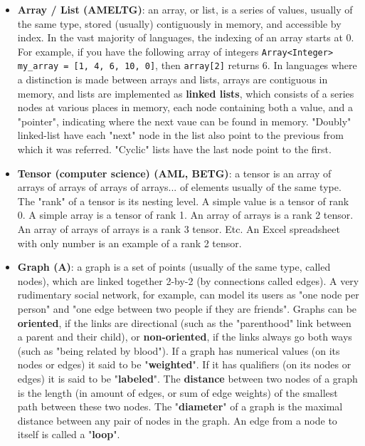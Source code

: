 \documentclass{article}
\begin{document}
\begin{itemize}

	\item \textbf{Array / List (AMELTG)}: an array, or list, is a series of values, usually of the same type, stored (usually) contiguously in memory, and accessible by index. In the vast majority of languages, the indexing of an array starts at 0. For example, if you have the following array of integers \texttt{Array<Integer> my\_array = [1, 4, 6, 10, 0]}, then \texttt{array[2]} returns 6. In languages where a distinction is made between arrays and lists, arrays are contiguous in memory, and lists are implemented as \textbf{linked lists}, which consists of a series nodes at various places in memory, each node containing both a value, and a "pointer", indicating where the next vaue can be found in memory. "Doubly" linked-list have each "next" node in the list also point to the previous from which it was referred. "Cyclic" lists have the last node point to the first.

	\item \textbf{Tensor (computer science) (AML, BETG)}: a tensor is an array of arrays of arrays of arrays of arrays... of elements usually of the same type. The "rank" of a tensor is its nesting level. A simple value is a tensor of rank 0. A simple array is a tensor of rank 1. An array of arrays is a rank 2 tensor. An array of arrays of arrays is a rank 3 tensor. Etc. An Excel spreadsheet with only number is an example of a rank 2 tensor.

	\item \textbf{Graph (A)}: a graph is a set of points (usually of the same type, called nodes), which are linked together 2-by-2 (by connections called edges). A very rudimentary social network, for example, can model its users as "one node per person" and "one edge between two people if they are friends". Graphs can be \textbf{oriented}, if the links are directional (such as the "parenthood" link between a parent and their child), or \textbf{non-oriented}, if the links always go both ways (such as "being related by blood"). If a graph has numerical values (on its nodes or edges) it said to be "\textbf{weighted}". If it has qualifiers (on its nodes or edges) it is said to be "\textbf{labeled}". The \textbf{distance} between two nodes of a graph is the length (in amount of edges, or sum of edge weights) of the smallest path between these two nodes. The "\textbf{diameter}" of a graph is the maximal distance between any pair of nodes in the graph. An edge from a node to itself is called a "\textbf{loop}".


\end{itemize}
\end{document}
